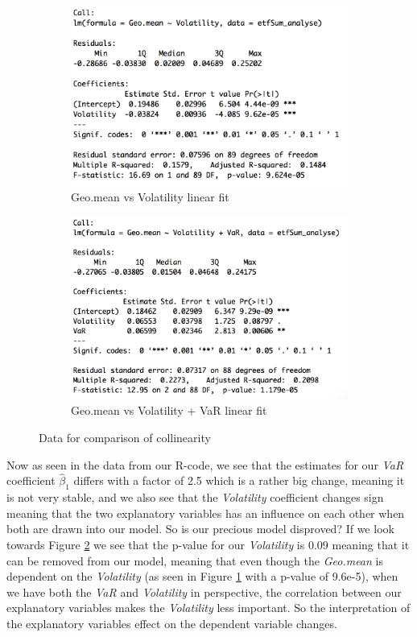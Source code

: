 \documentclass{article}
\begin{document}
\begin{figure}[h!]
\begin{subfigure}{0.5\textwidth}
\includegraphics[width=0.9\linewidth]{fig/lmGmVo} 
\caption{Geo.mean vs Volatility linear fit}
\label{fig:subim1}
\end{subfigure}
\hfill
\begin{subfigure}{0.5\textwidth}
\includegraphics[width=0.9\linewidth]{fig/lmGmVarVo}
\caption{Geo.mean vs Volatility + VaR linear fit}
\label{fig:subim2}
\end{subfigure}
\caption{Data for comparison of collinearity}
\label{fig:Data}
\end{figure}

Now as seen in the data from our R-code, we see that the estimates for our \textit{VaR} coefficient $\hat{\beta}_1$ differs with a factor of 2.5 which is a rather big change, meaning it is not very stable, and we also see that the \textit{Volatility} coefficient changes sign meaning that the two explanatory variables has an influence on each other when both are drawn into our model. So is our precious model disproved? If we look towards Figure \ref{fig:subim2} we see that the p-value for our \textit{Volatility} is 0.09 meaning that it can be removed from our model, meaning that even though the \textit{Geo.mean} is dependent on the \textit{Volatility} (as seen in Figure \ref{fig:subim1} with a p-value of 9.6e-5), when we have both the \textit{VaR} and \textit{Volatility} in perspective, the correlation between our explanatory variables makes the \textit{Volatility} less important. So the interpretation of the explanatory variables effect on the dependent variable changes. \\
\end{document}
